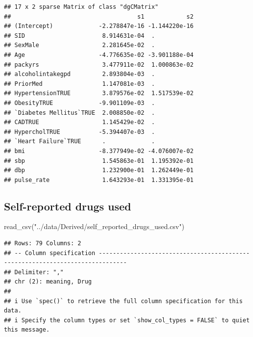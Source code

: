 \documentclass[
]{article}
\newenvironment{Shaded}{\begin{snugshade}}{\end{snugshade}}
\newcommand{\FloatTok}[1]{\textcolor[rgb]{0.00,0.00,0.81}{#1}}
\newcommand{\FunctionTok}[1]{\textcolor[rgb]{0.00,0.00,0.00}{#1}}
\newcommand{\NormalTok}[1]{#1}
\newcommand{\SpecialCharTok}[1]{\textcolor[rgb]{0.00,0.00,0.00}{#1}}
\newcommand{\StringTok}[1]{\textcolor[rgb]{0.31,0.60,0.02}{#1}}
\begin{document}
\begin{Shaded}
\end{Shaded}

\begin{verbatim}
## 17 x 2 sparse Matrix of class "dgCMatrix"
##                                    s1            s2
## (Intercept)             -2.278847e-16 -1.144220e-16
## SID                      8.914631e-04  .           
## SexMale                  2.281645e-02  .           
## Age                     -4.776635e-02 -3.901188e-04
## packyrs                  3.477911e-02  1.000863e-02
## alcoholintakegpd         2.893804e-03  .           
## PriorMed                 1.147081e-03  .           
## HypertensionTRUE         3.879576e-02  1.517539e-02
## ObesityTRUE             -9.901109e-03  .           
## `Diabetes Mellitus`TRUE  2.008850e-02  .           
## CADTRUE                  1.145429e-02  .           
## HypercholTRUE           -5.394407e-03  .           
## `Heart Failure`TRUE      .             .           
## bmi                     -8.377949e-02 -4.076007e-02
## sbp                      1.545863e-01  1.195392e-01
## dbp                      1.232900e-01  1.262449e-01
## pulse_rate               1.643293e-01  1.331395e-01
\end{verbatim}

\hypertarget{self-reported-drugs-used}{%
\subsection{Self-reported drugs used}\label{self-reported-drugs-used}}

\begin{Shaded}
\begin{Highlighting}[]
\FunctionTok{read\_csv}\NormalTok{(}\StringTok{"../data/Derived/self\_reported\_drugs\_used.csv"}\NormalTok{)}
\end{Highlighting}
\end{Shaded}

\begin{verbatim}
## Rows: 79 Columns: 2
## -- Column specification ------------------------------------------------------------------------------
## Delimiter: ","
## chr (2): meaning, Drug
## 
## i Use `spec()` to retrieve the full column specification for this data.
## i Specify the column types or set `show_col_types = FALSE` to quiet this message.
\end{verbatim}
\end{document}
